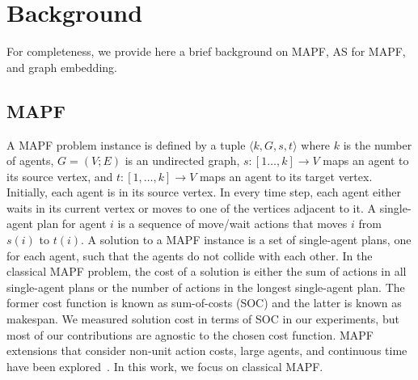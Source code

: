 \documentclass[letterpaper]{article} %
\newcommand{\tuple}[1]{\ensuremath{\langle #1\rangle}}
\newcommand{\Roni}[1]{}
\begin{document}





\section{Background}
\label{scn:Background}


For completeness, we provide here a brief background on MAPF, AS for MAPF, and graph embedding.

\subsection{MAPF}
A MAPF problem instance is defined by a tuple $\tuple{k,G,s,t}$
where
$k$ is the number of agents,
$G = (V;E)$ is an undirected graph,
$s: [1\ldots, k]\rightarrow V$ maps an agent to its source vertex,
and $t: [1,\ldots, k]\rightarrow V$ maps an agent to its target vertex.
Initially, each agent is in its source vertex.
In every time step, each agent either waits
in its current vertex or moves to one of the vertices adjacent to it.
A single-agent plan for agent $i$ is a sequence of move/wait actions that moves $i$ from $s(i)$ to $t(i)$.
A solution to a MAPF instance is a set of single-agent plans, one for each agent, such that the agents do not collide with each other.
In the classical MAPF problem, the cost of a solution is either the sum of actions in all single-agent plans
or the number of actions in the longest single-agent plan. The former cost function is known as sum-of-costs (SOC) and the latter is known as makespan.
We measured solution cost in terms of SOC in our experiments, but most of our contributions are agnostic to the chosen cost function.
MAPF extensions that consider non-unit action costs, large agents, and continuous time have been explored~\cite{atzmon2020generalizing,andreychuk2022multi,li2019multi}. In this work, we focus on classical MAPF.
\end{document}
